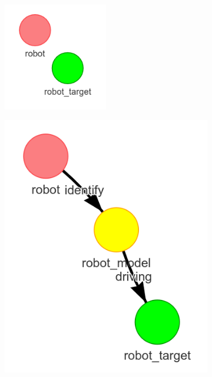 \begin{figure}[H]
    \centering
    \begin{subfigure}{.3\textwidth}
    \centering
    \includegraphics[width=0.5\textwidth]{figures/connecting_nodes/blocking_obj_1}
    \caption{}
    \end{subfigure}
    \begin{subfigure}{.3\textwidth}
    \centering
    \includegraphics[width=\textwidth]{figures/connecting_nodes/blocking_obj_2}

\end{subfigure}
\end{figure}
